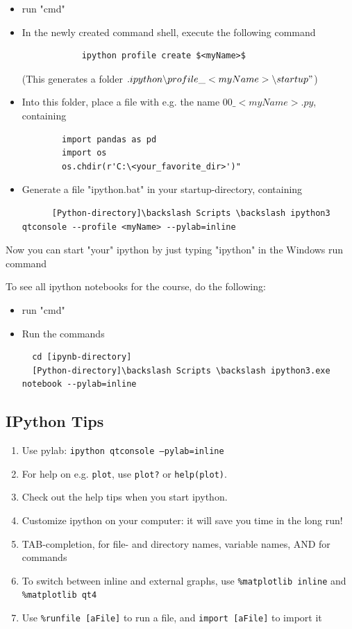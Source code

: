 \begin{itemize}
  \item run "cmd"

  \item In the newly created command shell, execute the following command
        \begin{lstlisting}
            ipython profile create $<myName>$
        \end{lstlisting}
        (This generates a folder $.ipython \backslash profile\_<myName> \backslash startup"$)
  \item Into this folder, place a file with e.g. the name $00\_<myName>.py$, containing
        \begin{lstlisting}
        import pandas as pd
        import os
        os.chdir(r'C:\<your_favorite_dir>')"
        \end{lstlisting}
  \item Generate a file "ipython.bat" in your startup-directory, containing
      \begin{lstlisting}
      [Python-directory]\backslash Scripts \backslash ipython3 qtconsole --profile <myName> --pylab=inline
      \end{lstlisting}
\end{itemize}

Now you can start "your" ipython by just typing "ipython" in the Windows run command

To see all ipython notebooks for the course, do the following:
\begin{itemize}
  \item run "cmd"
  \item Run the commands
  \begin{lstlisting}
  cd [ipynb-directory]
  [Python-directory]\backslash Scripts \backslash ipython3.exe notebook --pylab=inline
  \end{lstlisting}
\end{itemize}



\subsection{IPython Tips}

\begin{enumerate}
    \item Use pylab: \texttt{ipython qtconsole ---pylab=inline}
    \item For help on e.g. \texttt{plot}, use \texttt{plot?} or \texttt{help(plot)}.
    \item Check out the help tips when you start ipython.
    \item Customize ipython on your computer: it will save you time in the long run!
    \item TAB-completion, for file- and directory names, variable names, AND for commands
    \item To switch between inline and external graphs, use \texttt{\%matplotlib inline} and \texttt{\%matplotlib qt4}
    \item Use \texttt{\%runfile [aFile]} to run a file, and \texttt{import [aFile]} to import it
\end{enumerate}

